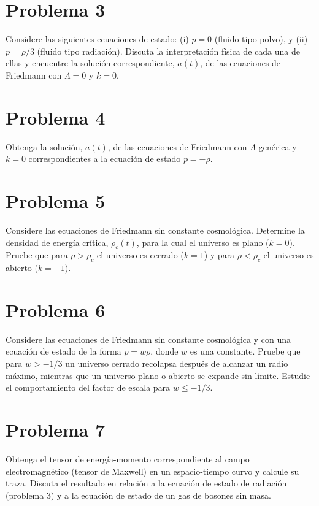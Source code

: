 \documentclass[11pt,a4paper]{article}
\begin{document}
\section*{Problema 3}
Considere las siguientes ecuaciones de estado: (i) $p=0$ (fluido tipo polvo), y (ii) $p=\rho/3$ (fluido tipo radiación). Discuta la interpretación física de cada una de ellas y encuentre la solución correspondiente, $a(t)$, de las ecuaciones de Friedmann con $\Lambda=0$ y $k=0$.

\section*{Problema 4}
Obtenga la solución, $a(t)$, de las ecuaciones de Friedmann con $\Lambda$ genérica y $k=0$ correspondientes a la ecuación de estado $p=-\rho$.

\section*{Problema 5}
Considere las ecuaciones de Friedmann sin constante cosmológica. Determine la densidad de energía crítica, $\rho_c(t)$, para la cual el universo es plano ($k=0$). Pruebe que para $\rho>\rho_c$ el universo es cerrado ($k=1$) y para $\rho<\rho_c$ el universo es abierto ($k=-1$).

\section*{Problema 6}
Considere las ecuaciones de Friedmann sin constante cosmológica y con una ecuación de estado de la forma $p=w\rho$, donde $w$ es una constante. Pruebe que para $w>-1/3$ un universo cerrado recolapsa después de alcanzar un radio máximo, mientras que un universo plano o abierto se expande sin límite. Estudie el comportamiento del factor de escala para $w\leq-1/3$.

\section*{Problema 7}
Obtenga el tensor de energía-momento correspondiente al campo electromagnético (tensor de Maxwell) en un espacio-tiempo curvo y calcule su traza. Discuta el resultado en relación a la ecuación de estado de radiación (problema 3) y a la ecuación de estado de un gas de bosones sin masa.
\end{document}
